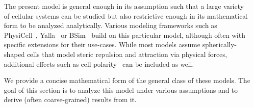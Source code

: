 The present model is general enough in its assumption such that a large variety of cellular systems
can be studied but also restrictive enough in its mathematical form to be analyzed analytically.
Various modeling frameworks such as PhysiCell~\cite{Ghaffarizadeh2018}, Yalla~\cite{Germann2019} or
BSim~\cite{Gorochowski2012,Matyjaszkiewicz2017} build on this particular model, although often with
specific extensions for their use-cases.
While most models assume spherically-shaped cells that model steric repulsion and attraction via
physical forces, additional effects such as cell polarity~\cite{Szab2006} can be included as well.

We provide a concise mathematical form of the general class of these models.
The goal of this section is to analyze this model under various assumptions and to derive (often
coarse-grained) results from it.


